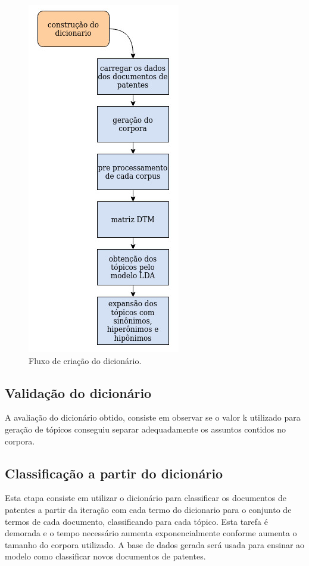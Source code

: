 \begin{figure}[ht!]
	\centering
	\includegraphics[scale=0.5]{imagens/tcc_dicionario.jpg}
	\caption{Fluxo de criação do dicionário.
			 \label{dicionario_flow_image}}
\end{figure}

\subsection{Validação do dicionário}
A avaliação do dicionário obtido, consiste em observar se o valor k utilizado para geração de tópicos conseguiu separar adequadamente os assuntos contidos no corpora.

\subsection{Classificação a partir do dicionário}
Esta etapa consiste em utilizar o dicionário para classificar os documentos de patentes a partir da iteração com cada termo do dicionario para o conjunto de termos de cada documento, classificando para cada tópico. Esta tarefa é demorada e o tempo necessário aumenta exponencialmente conforme aumenta o tamanho do corpora utilizado. A base de dados gerada será usada para ensinar ao modelo como classificar novos documentos de patentes.


